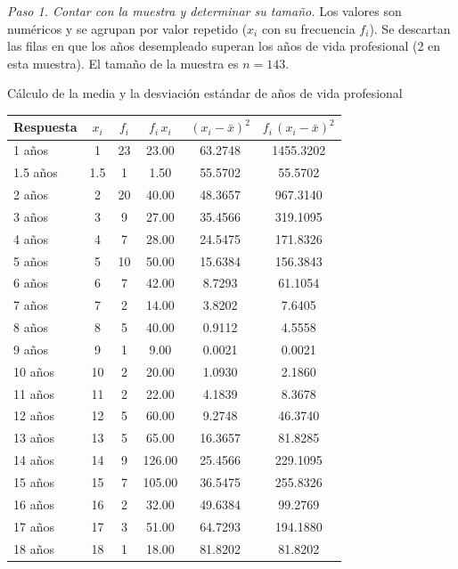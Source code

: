 \textit{Paso 1. Contar con la muestra y determinar su tamaño.} Los valores son numéricos y se agrupan por valor repetido ($x_i$ con su frecuencia $f_i$). Se descartan las filas en que los años desempleado superan los años de vida profesional (2 en esta muestra). El tamaño de la muestra es $n = 143$.

\begin{mitabla}{Cálculo de la media y la desviación estándar de años de vida profesional}
\begin{tabular}{lccccc}
\toprule
Respuesta & $x_i$ & $f_i$ & $f_i\,x_i$ & $(x_i-\bar{x})^2$ & $f_i\,(x_i-\bar{x})^2$ \\
\midrule
1 años & 1 & 23 & 23.00 & 63.2748 & 1455.3202 \\
1.5 años & 1.5 & 1 & 1.50 & 55.5702 & 55.5702 \\
2 años & 2 & 20 & 40.00 & 48.3657 & 967.3140 \\
3 años & 3 & 9 & 27.00 & 35.4566 & 319.1095 \\
4 años & 4 & 7 & 28.00 & 24.5475 & 171.8326 \\
5 años & 5 & 10 & 50.00 & 15.6384 & 156.3843 \\
6 años & 6 & 7 & 42.00 & 8.7293 & 61.1054 \\
7 años & 7 & 2 & 14.00 & 3.8202 & 7.6405 \\
8 años & 8 & 5 & 40.00 & 0.9112 & 4.5558 \\
9 años & 9 & 1 & 9.00 & 0.0021 & 0.0021 \\
10 años & 10 & 2 & 20.00 & 1.0930 & 2.1860 \\
11 años & 11 & 2 & 22.00 & 4.1839 & 8.3678 \\
12 años & 12 & 5 & 60.00 & 9.2748 & 46.3740 \\
13 años & 13 & 5 & 65.00 & 16.3657 & 81.8285 \\
14 años & 14 & 9 & 126.00 & 25.4566 & 229.1095 \\
15 años & 15 & 7 & 105.00 & 36.5475 & 255.8326 \\
16 años & 16 & 2 & 32.00 & 49.6384 & 99.2769 \\
17 años & 17 & 3 & 51.00 & 64.7293 & 194.1880 \\
18 años & 18 & 1 & 18.00 & 81.8202 & 81.8202 \\

\end{tabular}
\end{mitabla}
